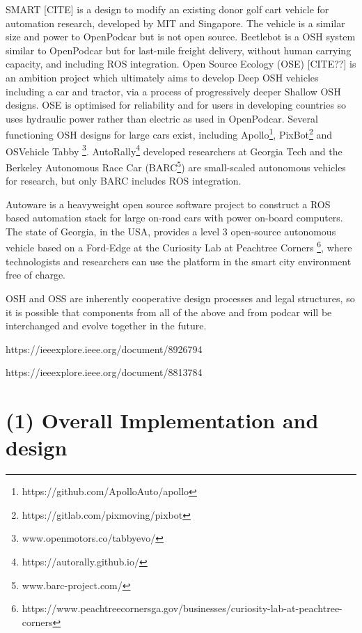 \documentclass[a4paper]{article}
\begin{document}
SMART [CITE] is a design to modify an existing donor golf cart vehicle for automation research, developed by MIT and Singapore.  The vehicle is a similar size and power to OpenPodcar but is not open source.
Beetlebot \cite{beetlebot} is a OSH system similar to OpenPodcar but for last-mile freight delivery, without human carrying capacity, and including ROS integration.
Open Source Ecology (OSE) [CITE??] is an ambition project which ultimately aims to develop Deep OSH vehicles including a car and tractor, via a process of progressively deeper Shallow OSH designs.  OSE is optimised for reliability and for users in developing countries so uses hydraulic power rather than electric as used in OpenPodcar.
Several functioning OSH designs for large cars exist, including Apollo\footnote{https://github.com/ApolloAuto/apollo}, PixBot\footnote{https://gitlab.com/pixmoving/pixbot} and OSVehicle Tabby \footnote{www.openmotors.co/tabbyevo/}.  AutoRally\footnote{https://autorally.github.io/} \cite{goldfain2019autorally} developed researchers at Georgia Tech and the Berkeley Autonomous Race Car (BARC\footnote{www.barc-project.com/}) are small-scaled autonomous vehicles for research, but only BARC includes ROS integration. 

Autoware \cite{kato2018autoware} is a heavyweight open source software project to construct a ROS based automation stack for large on-road cars with power on-board computers.
The state of Georgia, in the USA, provides a level 3 open-source autonomous vehicle based on a Ford-Edge at the Curiosity Lab at Peachtree Corners \footnote{https://www.peachtreecornersga.gov/businesses/curiosity-lab-at-peachtree-corners}, where technologists and researchers can use the platform in the smart city environment free of charge.


OSH and OSS are inherently cooperative design processes and legal structures, so it is possible that components from all of the above and from podcar will be interchanged and evolve together in the future.

https://ieeexplore.ieee.org/document/8926794


https://ieeexplore.ieee.org/document/8813784



\section{(1) Overall Implementation and design}\label{h.1u7vph94gfbt}

\end{document}
